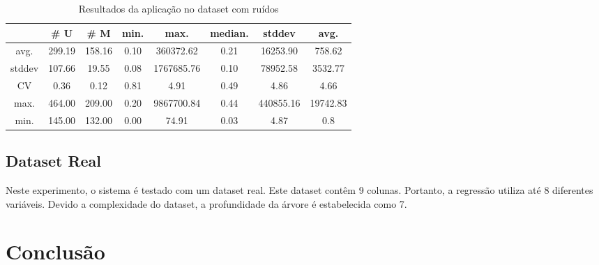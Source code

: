 \documentclass[a4paper]{paper}
\begin{document}
\begin{table}
  \center
  \caption{Resultados da aplicação no dataset com ruídos}
  \label{tbl:noise_dataset}
  \begin{tabular}{| c | c | c | c | c | c | c | c |}
    \hline
    &  \# U & \# M & min. & max. & median. & stddev & avg. \\ \hline 
avg. & 299.19 & 158.16 & 0.10 & 360372.62 & 0.21 & 16253.90 & 758.62 \\ \hline 
stddev & 107.66 & 19.55 & 0.08 & 1767685.76 & 0.10 & 78952.58 & 3532.77 \\ \hline 
CV & 0.36 & 0.12 & 0.81 & 4.91 & 0.49 & 4.86 & 4.66 \\ \hline 
max. & 464.00 & 209.00 & 0.20 & 9867700.84 & 0.44 & 440855.16 & 19742.83 \\ \hline 
min. & 145.00 & 132.00 & 0.00 & 74.91 & 0.03 & 4.87 & 0.8 \\ \hline
  \end{tabular}
\end{table}


\subsection{Dataset Real}
Neste experimento, o sistema é testado com um dataset real. Este dataset contêm
9 colunas. Portanto, a regressão utiliza até 8 diferentes variáveis. Devido a
complexidade do dataset, a profundidade da árvore é estabelecida como 7.



\section{Conclusão}


\citet*{poli2008}


\end{document}
